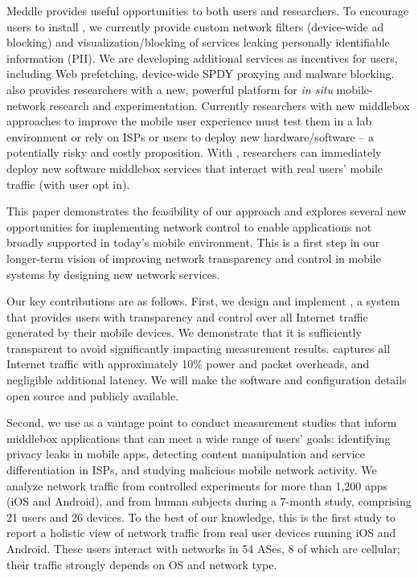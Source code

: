 
Meddle provides useful opportunities to both users and researchers.
To encourage users to install \meddle, we currently provide custom 
network filters (\eg device-wide ad blocking) and visualization/blocking of services leaking 
personally identifiable information (PII). We are developing additional services as incentives 
for users, including Web prefetching, device-wide SPDY proxying and malware blocking.
\meddle also provides researchers with a new, powerful platform for \emph{in situ} 
mobile-network research and experimentation. Currently researchers with new  
middlebox approaches to improve the mobile user experience must test them in a lab environment or 
rely on ISPs or users to deploy new hardware/software -- a potentially risky and costly 
proposition. With \meddle, researchers 
can immediately deploy new software middlebox services that interact with 
real users' mobile traffic (with user opt in). %

This paper demonstrates the feasibility of our approach and explores several new opportunities 
for implementing network control to enable applications not broadly supported in today's mobile 
environment. This is a first step in our longer-term vision of improving network transparency and control 
in mobile systems by designing new network services.

Our key contributions are as follows. First, we design and implement \meddle, a system that provides users with transparency 
and control %
over all Internet traffic generated by their 
mobile devices. We demonstrate that it is sufficiently transparent to avoid significantly impacting measurement results. 
\platname captures all Internet traffic with approximately 10\% power and packet overheads, and negligible additional latency. 
We will make the \platname software and configuration details open source and publicly available.

Second, we use \meddle as a vantage point to conduct measurement studies that inform 
middlebox applications that can meet a wide range of users' goals: identifying privacy leaks in mobile apps, detecting content 
manipulation and service differentiation in ISPs, and studying malicious mobile network activity. We analyze network traffic from controlled experiments for more than 1,200 apps (iOS and Android), 
and from human subjects during a 7-month study, comprising 21 users and 26 devices. To the best of our knowledge, this is the first study to report a holistic 
view of network traffic from real user devices running iOS and Android. These users interact with networks in 54 ASes,
8 of which are cellular; their traffic strongly depends on OS and network type.


